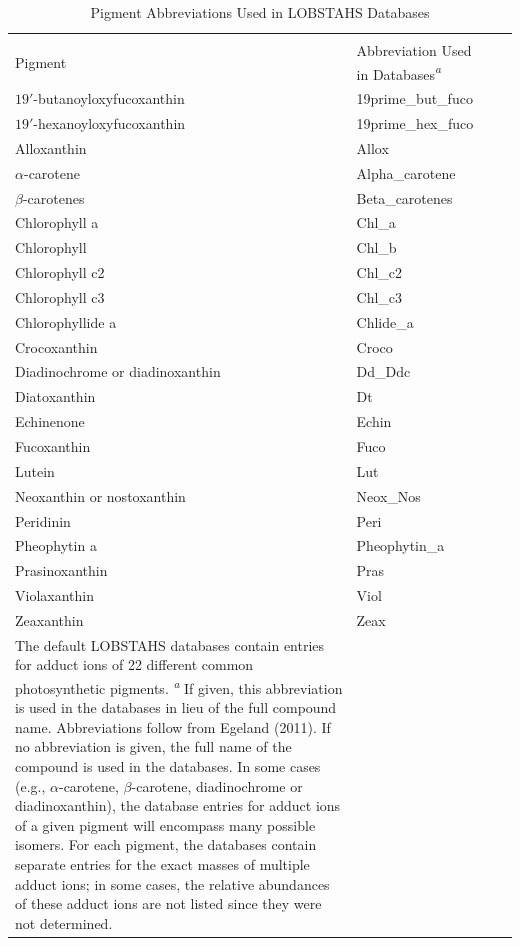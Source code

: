 \clearpage

\begin{normalsize}
\begin{singlespace}
\begin{flushleft}
\begin{longtable}{ Lp{.5\linewidth} Lp{.47\linewidth}}
\caption[Pigment Abbreviations Used in LOBSTAHS Databases]{Pigment Abbreviations Used in LOBSTAHS Databases}\\
\label{table:adn3}
\endfirsthead
\endhead
\toprule
Pigment & Abbreviation Used in Databases\emph{\textsuperscript{a}} \\
\midrule
$19'$-butanoyloxyfucoxanthin & 19prime\_but\_fuco \\
$19'$-hexanoyloxyfucoxanthin & 19prime\_hex\_fuco \\
Alloxanthin & Allox \\
$\alpha$-carotene & Alpha\_carotene \\
$\beta$-carotenes & Beta\_carotenes \\
Chlorophyll a & Chl\_a \\
Chlorophyll & Chl\_b \\
Chlorophyll c2 & Chl\_c2 \\
Chlorophyll c3 & Chl\_c3 \\
Chlorophyllide a & Chlide\_a \\
Crocoxanthin & Croco \\
Diadinochrome or diadinoxanthin & Dd\_Ddc \\
Diatoxanthin & Dt \\
Echinenone & Echin \\
Fucoxanthin & Fuco \\
Lutein & Lut \\
Neoxanthin or nostoxanthin & Neox\_Nos \\
Peridinin & Peri \\
Pheophytin a & Pheophytin\_a \\
Prasinoxanthin & Pras \\
Violaxanthin & Viol \\
Zeaxanthin & Zeax\\
\bottomrule
{}
\caption*{The default LOBSTAHS databases contain entries for adduct ions of 22 different common photosynthetic pigments.\\
\emph{\textsuperscript{a}} If given, this abbreviation is used in the databases in lieu of the full compound name. Abbreviations follow from Egeland (2011). If no abbreviation is given, the full name of the compound is used in the databases. In some cases (e.g., $\alpha$-carotene, $\beta$-carotene, diadinochrome or diadinoxanthin), the database entries for adduct ions of a given pigment will encompass many possible isomers. For each pigment, the databases contain separate entries for the exact masses of multiple adduct ions; in some cases, the relative abundances of these adduct ions are not listed since they were not determined.
}
\end{longtable}
\end{flushleft}
\end{singlespace}
\end{normalsize}


